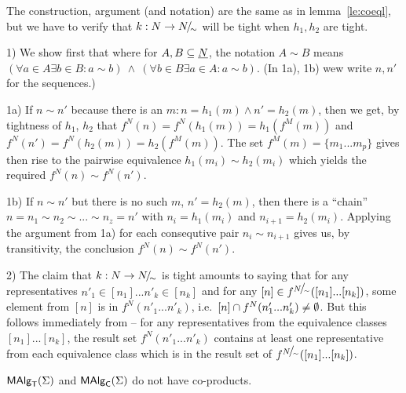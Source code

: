 \documentclass[10pt]{article}
\begin{document}
\begin{Proof}
The construction, argument (and notation) are the same as in
lemma~\ref{le:coeql}, but we have to verify that $k:N\rightarrow
N\!{\textstyle /}\!_{\sim}$ will be tight when $h_1,h_2$ are tight.

1) We show first that  where for
$A,B\subseteq\underline {N}$, the notation $A\sim B$ means $(\forall a\in
A\exists b\in B:a\sim b)\ \land\ (\forall b\in B\exists a\in A:a\sim
b)$. (In 1a), 1b) wew write $n,n'$ for the sequences.)

1a) If $n\sim n'$ because there is an $m:n=h_1(m)\land n'=h_2(m)$,
then we get, by tightness of $h_1$, $h_2$ that
$f^N(n)=f^N(h_1(m))=h_1(f^M(m))$ and
$f^N(n')=f^N(h_2(m))=h_2(f^M(m))$. The set $f^M(m)=\{m_1...m_p\}$
gives then rise to the pairwise equivalence $h_1(m_i)\sim h_2(m_i)$
which yields the required $f^N(n)\sim f^N(n')$.

1b) If $n\sim n'$ but there is no such $m$, %
$n'=h_2(m)$, then there is a ``chain'' $n=n_1\sim n_2\sim...\sim
n_z=n'$ with $n_i=h_1(m_i)$ and $n_{i+1}=h_2(m_i)$.
Applying the argument from 1a) for each consequtive pair $n_i\sim
n_{i+1}$ gives us, by transitivity, the conclusion $f^N(n)\sim
f^N(n')$.

2) The claim that $k:N\rightarrow N\!{\textstyle /}\!_{\sim}$ is tight amounts to saying
that for any representatives $n'_1\in[n_1]...n'_k\in[n_k]$ and for any
$[n]\in f^{N\!{\textstyle /}\!_{\sim}}([n_1]...[n_k])$, some element from $[n]$ is
in $f^N(n'_1...n'_k)$, i.e.\ $[n]\cap f^N(n'_1...n'_k)\not=\emptyset$.  But
this follows immediately from  -- for any representatives
from the equivalence classes $[n_1]...[n_k]$, the result set
$f^N(n'_1...n'_k)$ contains at least one representative from each
equivalence class which is in the result set of
$f^{N\!{\textstyle /}\!_{\sim}}([n_1]...[n_k])$.
\end{Proof}


\begin{Fact}
$\mbox{\rm\sf MAlg}_{\sf T}(\Sigma)$ and $\mbox{\rm\sf MAlg}_{\sf C}(\Sigma)$ do not have co-products.
\end{Fact}
\end{document}
